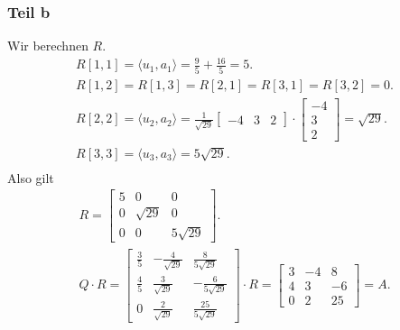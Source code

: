 \documentclass[fleqn,draft,a5paper]{article}
\providecommand{\skp}[1]{\langle#1\rangle}
\theoremstyle{remark}
\begin{document}
  \subsubsection{Teil b}
  Wir berechnen \(R\).
  \begin{multline*}
    R[1,1] = \skp{u_{1}, a_{1}} = \frac{9}{5} + \frac{16}{5} = 5. \\
    R[1,2] = R[1,3] = R[2,1] = R[3,1] = R[3,2] = 0. \\
    R[2,2] = \skp{u_{2}, a_{2}} = \frac{1}{\sqrt{29}}
    \begin{bmatrix}
      -4 & 3 & 2
    \end{bmatrix}\cdot
    \begin{bmatrix}
      -4 \\ 3 \\ 2
    \end{bmatrix} = \sqrt{29}. \\
    R[3,3] = \skp{u_{3}, a_{3}} = 5\sqrt{29}. \\
  \end{multline*}
  Also gilt
  \begin{multline*}
    R =
    \begin{bmatrix}
      5 & 0 & 0 \\ 0 & \sqrt{29} & 0 \\ 0 & 0 & 5\sqrt{29}
    \end{bmatrix}. \\
    Q \cdot R =     \begin{bmatrix}
      \frac35 & - \frac{4}{\sqrt{29}} & \frac{8}{5\sqrt{29}} \\
      \frac45 & \frac{3}{\sqrt{29}} & - \frac{6}{5\sqrt{29}} \\
      0 & \frac{2}{\sqrt{29}} & \frac{25}{5\sqrt{29}}
    \end{bmatrix} \cdot R =
    \begin{bmatrix}
    3 & -4 & 8 \\
    4 & 3 & -6 \\
    0 & 2 & 25
    \end{bmatrix} = A. \\
  \end{multline*}
\end{document}
